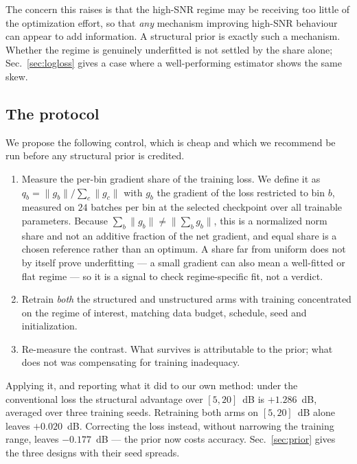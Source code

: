 \documentclass[journal]{IEEEtran}
\begin{document}
The concern this raises is that the high-SNR regime may be receiving too little
of the optimization effort, so that \emph{any} mechanism improving high-SNR
behaviour can appear to add information. A structural prior is exactly such a
mechanism. Whether the regime is genuinely underfitted is not settled by the
share alone; Sec.~\ref{sec:logloss} gives a case where a well-performing
estimator shows the same skew.

\subsection{The protocol}

We propose the following control, which is cheap and which we recommend be run
before any structural prior is credited.

\begin{enumerate}
\item Measure the per-bin gradient share of the training loss. We define it as
$q_b=\|g_b\|/\sum_c\|g_c\|$ with $g_b$ the gradient of the loss restricted to
bin $b$, measured on $24$ batches per bin at the selected checkpoint over all
trainable parameters. Because $\sum_b\|g_b\|\neq\|\sum_b g_b\|$, this is a
normalized norm share and not an additive fraction of the net gradient, and
equal share is a chosen reference rather than an optimum. A share far from
uniform does not by itself prove underfitting --- a small gradient can also
mean a well-fitted or flat regime --- so it is a signal to check
regime-specific fit, not a verdict.
\item Retrain \emph{both} the structured and unstructured arms with training
concentrated on the regime of interest, matching data budget, schedule, seed
and initialization.
\item Re-measure the contrast. What survives is attributable to the prior;
what does not was compensating for training inadequacy.
\end{enumerate}

Applying it, and reporting what it did to our own method: under the
conventional loss the structural advantage over $[5,20]$~dB is
$+1.286$~dB, averaged over three training seeds. Retraining both arms on
$[5,20]$~dB alone leaves $+0.020$~dB. Correcting the loss instead, without
narrowing the training range, leaves
$-0.177$~dB --- the prior now costs accuracy. Sec.~\ref{sec:prior} gives the
three designs with their seed spreads.
\end{document}
